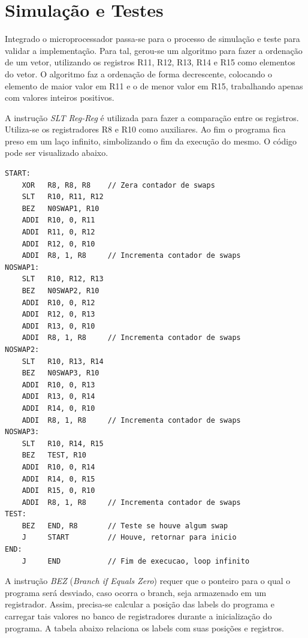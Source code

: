 \documentclass[11pt,a4paper,titlepage]{article}
\begin{document}
\section{Simulação e Testes}

Integrado o microprocessador passa-se para o processo de simulação e teste para validar a implementação. Para tal, gerou-se um algoritmo para fazer a ordenação de um vetor, utilizando os registros R11, R12, R13, R14 e R15 como elementos do vetor. O algoritmo faz a ordenação de forma decrescente, colocando o elemento de maior valor em R11 e o de menor valor em R15, trabalhando apenas com valores inteiros positivos.

A instrução \textit{SLT Reg-Reg} é utilizada para fazer a comparação entre os registros. Utiliza-se os registradores R8 e R10 como auxiliares. Ao fim o programa fica preso em um laço infinito, simbolizando o fim da execução do mesmo. O código pode ser visualizado abaixo.

\lstset{language=[mips]Assembler}
\begin{lstlisting}
START:
    XOR   R8, R8, R8    // Zera contador de swaps
    SLT   R10, R11, R12   
    BEZ   N0SWAP1, R10
    ADDI  R10, 0, R11
    ADDI  R11, 0, R12
    ADDI  R12, 0, R10
    ADDI  R8, 1, R8     // Incrementa contador de swaps
NOSWAP1:
    SLT   R10, R12, R13
    BEZ   N0SWAP2, R10
    ADDI  R10, 0, R12
    ADDI  R12, 0, R13
    ADDI  R13, 0, R10
    ADDI  R8, 1, R8     // Incrementa contador de swaps
NOSWAP2:
    SLT   R10, R13, R14
    BEZ   N0SWAP3, R10
    ADDI  R10, 0, R13
    ADDI  R13, 0, R14
    ADDI  R14, 0, R10
    ADDI  R8, 1, R8     // Incrementa contador de swaps
NOSWAP3:
    SLT   R10, R14, R15
    BEZ   TEST, R10
    ADDI  R10, 0, R14
    ADDI  R14, 0, R15
    ADDI  R15, 0, R10
    ADDI  R8, 1, R8     // Incrementa contador de swaps
TEST:
    BEZ   END, R8       // Teste se houve algum swap
    J     START         // Houve, retornar para inicio
END:
    J     END           // Fim de execucao, loop infinito
\end{lstlisting}

A instrução \textit{BEZ} (\textit{Branch if Equals Zero}) requer que o ponteiro para o qual o programa será desviado, caso ocorra o branch, seja armazenado em um registrador. Assim, precisa-se calcular a posição das labels do programa e carregar tais valores no banco de registradores durante a inicialização do programa. A tabela abaixo relaciona os labels com suas posições e registros.
\end{document}
